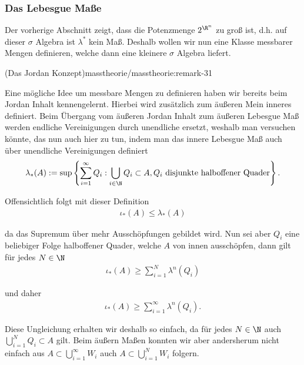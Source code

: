 \documentclass[letterpaper,10pt,english]{jupyterBook}
\begin{document}
\subsubsection{Das Lebesgue Maße}
\label{\detokenize{masstheorie/masstheorie:das-lebesgue-masze}}
\par
Der vorherige Abschnitt zeigt, dass die Potenzmenge \(2^{\R^n}\) zu groß ist, d.h. auf dieser \(\sigma\) Algebra ist \(\lambda^\ast\) kein Maß. Deshalb wollen wir nun eine Klasse messbarer Mengen definieren, welche dann eine kleinere \(\sigma\) Algebra liefert.
\begin{remark}{(Das Jordan Konzept)}{masstheorie/masstheorie:remark-31}



\par
Eine mögliche Idee um messbare Mengen zu definieren haben wir bereits beim Jordan Inhalt kennengelernt. Hierbei wird zusätzlich zum äußeren Mein inneres definiert. Beim Übergang vom äußeren Jordan Inhalt zum äußeren Lebesgue Maß werden endliche Vereinigungen durch unendliche ersetzt, weshalb man versuchen könnte, das nun auch hier zu tun, indem man das innere Lebesgue Maß auch über unendliche Vereinigungen definiert
\begin{align*}
\lambda_\ast(A) := \sup\left\{\sum_{i=1}^\infty Q_i: \bigcup_{i\in\N} Q_i \subset A, Q_i\text{ disjunkte halboffener Quader}\right\}.
\end{align*}
\par
Offensichtlich folgt mit dieser Definition
\begin{align*}
\iota_\ast(A)\leq \lambda_\ast(A)
\end{align*}
\par
da das Supremum über mehr Ausschöpfungen gebildet wird. Nun sei aber \(Q_i\) eine beliebiger Folge halboffener Quader, welche \(A\) von innen ausschöpfen, dann gilt für jedes \(N\in\N\)
\begin{align*}
\iota_\ast(A) \geq \sum_{i=1}^N \lambda^n(Q_i)
\end{align*}
\par
und daher
\begin{align*}
\iota_\ast(A)\geq \sum_{i=1}^\infty \lambda^n(Q_i).
\end{align*}
\par
Diese Ungleichung erhalten wir deshalb so einfach, da für jedes \(N\in\N\) auch \(\bigcup_{i=1}^N Q_i\subset A\) gilt. Beim äußern Maßen konnten wir aber andersherum nicht einfach aus \(A\subset \bigcup_{i=1}^\infty W_i\) auch \(A\subset \bigcup_{i=1}^N W_i\) folgern.


\end{remark}
\end{document}
